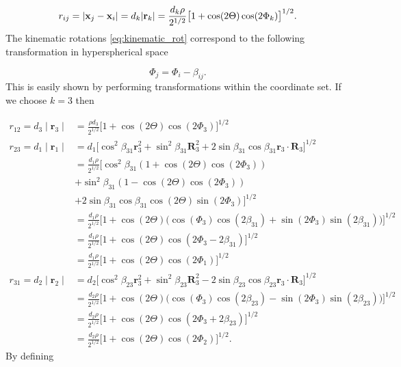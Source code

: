 \begin{equation}
r_{ij} = \lvert\mathbf{x}_j - \mathbf{x}_i\rvert = d_k \lvert\mathbf{r}_k\rvert = \frac{d_k\rho}{2^{1/2}}\big[1 + \cos(2\Theta)\cos(2\Phi_k)\big]^{1/2}.
\end{equation}
The kinematic rotations \eqref{eq:kinematic_rot} correspond to the following transformation in hyperspherical space 

\begin{equation}
	\Phi_j = \Phi_i-\beta_{ij}.
\end{equation}
This is easily shown by performing transformations within the coordinate set. If we choose $k=3$ then 

\begin{equation}
\begin{aligned}
r_{12} = d_3 \mid\mathbf{r}_{3}\mid &= \frac{\rho d_3}{2^{1/2}}\big[1+\cos(2\Theta)\cos(2\Phi_3)\big]^{1/2}\\
r_{23} = d_1 \mid\mathbf{r}_{1}\mid &= d_1 \big[\cos^2\beta_{31}\mathbf{r}^2_{3} + \sin^2\beta_{31}\mathbf{R}^2_3 + 2\sin\beta_{31}\cos\beta_{31}\mathbf{r}_3\cdot\mathbf{R}_3\big]^{1/2}\\
&= \frac{d_1\rho}{2^{1/2}} \big[\cos^2\beta_{31}(1 + \cos(2\Theta)\cos(2\Phi_3))\\ 
&+ \sin^2\beta_{31}(1 - \cos(2\Theta)\cos(2\Phi_3))\\ 
&+ 2\sin\beta_{31}\cos\beta_{31}\cos(2\Theta)\sin(2\Phi_3)\big]^{1/2}\\ 
&= \frac{d_1\rho}{2^{1/2}} \big[1 + \cos(2\Theta)\big(\cos(\Phi_3)\cos(2\beta_{31}) + \sin(2\Phi_3)\sin(2\beta_{31})\big)\big]^{1/2}\\ 
&= \frac{d_1\rho}{2^{1/2}}\big[1 + \cos(2\Theta)\cos(2\Phi_3 - 2\beta_{31})\big]^{1/2}\\ 
&= \frac{d_1\rho}{2^{1/2}}\big[1 + \cos(2\Theta)\cos(2\Phi_1)\big]^{1/2}\\ 
r_{31} = d_2 \mid\mathbf{r}_{2}\mid
&= d_2 \big[\cos^2\beta_{23}\mathbf{r}^2_{3} + \sin^2\beta_{23}\mathbf{R}^2_3 - 2\sin\beta_{23}\cos\beta_{23}\mathbf{r}_3\cdot\mathbf{R}_3\big]^{1/2}\\ 
&= \frac{d_2\rho}{2^{1/2}} \big[1 + \cos(2\Theta)\big(\cos(\Phi_3)\cos(2\beta_{23}) - \sin(2\Phi_3)\sin(2\beta_{23})\big)\big]^{1/2}\\ 
&= \frac{d_2\rho}{2^{1/2}}\big[1 + \cos(2\Theta)\cos(2\Phi_3 + 2\beta_{23})\big]^{1/2}\\
&= \frac{d_2\rho}{2^{1/2}}\big[1 + \cos(2\Theta)\cos(2\Phi_2)\big]^{1/2}.
\end{aligned}
\end{equation}
By defining

